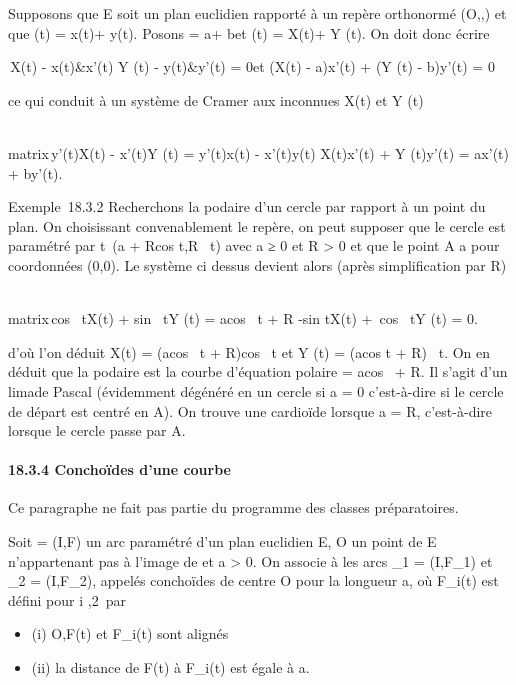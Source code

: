 \documentclass[]{article}
\begin{document}
Supposons que E soit un plan euclidien rapporté à un repère orthonormé
(O,\vec\imath,) et que
\overrightarrowOF(t) = x(t)\vec\imath +
y(t). Posons
\overrightarrowOA = a\vec\imath +
b et \overrightarrowOG(t) =
X(t)\vec\imath + Y (t). On doit
donc écrire

\left
\textbar{}\matrix\,X(t) - x(t)&x'(t)
\cr Y (t) - y(t)&y'(t)\right \textbar{}
= 0\text et (X(t) - a)x'(t) + (Y (t) - b)y'(t) = 0

ce qui conduit à un système de Cramer aux inconnues X(t) et Y (t)

\left
\\matrix\,y'(t)X(t) -
x'(t)Y (t) = y'(t)x(t) - x'(t)y(t) \cr X(t)x'(t) + Y
(t)y'(t) = ax'(t) + by'(t)\right .

Exemple~18.3.2 Recherchons la podaire d'un cercle par rapport à un point
du plan. On choisissant convenablement le repère, on peut supposer que
le cercle est paramétré par t\mapsto~(a +
Rcos t,R\sin~ t) avec
a ≥ 0 et R \textgreater{} 0 et que le point A a pour coordonnées (0,0).
Le système ci dessus devient alors (après simplification par R)

\left
\\matrix\,cos~
tX(t) + sin~ tY (t) =
acos~ t + R \cr
-sin tX(t) +\ cos~ tY
(t) = 0\right .

d'où l'on déduit X(t) = (acos~ t +
R)cos~ t et Y (t) =
(acos t + R)\sin~ t.
On en déduit que la podaire est la courbe d'équation polaire \rho =
acos~ \theta + R. Il s'agit d'un
lima\ccon de Pascal (évidemment dégénéré en un cercle
si a = 0 c'est-à-dire si le cercle de départ est centré en A). On trouve
une cardioïde lorsque a = R, c'est-à-dire lorsque le cercle passe par A.

\paragraph{18.3.4 Conchoïdes d'une courbe}

Ce paragraphe ne fait pas partie du programme des classes préparatoires.

Soit \Gamma = (I,F) un arc paramétré d'un plan euclidien E, O un point de E
n'appartenant pas à l'image de \Gamma et a \textgreater{} 0. On associe à \Gamma
les arcs \Gamma\_1 = (I,F\_1) et \Gamma\_2 =
(I,F\_2), appelés conchoïdes de centre O pour la longueur a, où
F\_i(t) est défini pour i
\in\1,2\ par

\begin{itemize}
\itemsep1pt\parskip0pt
\item
  (i) O,F(t) et F\_i(t) sont alignés
\item
  (ii) la distance de F(t) à F\_i(t) est égale à a.
\end{itemize}
\end{document}
